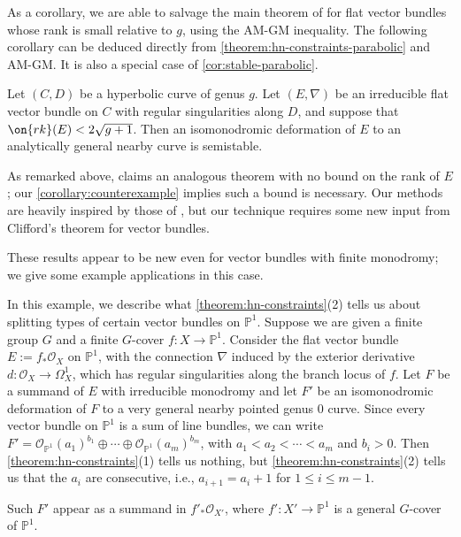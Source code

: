 As a corollary, we are able to salvage the main theorem of \cite{BHH:logarithmic} for flat vector bundles whose rank is small relative to $g$, using the AM-GM inequality.
The following corollary can be deduced directly from
\autoref{theorem:hn-constraints-parabolic} and AM-GM.
It is also a special
case of \autoref{cor:stable-parabolic}.
\begin{corollary}
\notready\label{cor:stable}
	Let $(C, D)$ be a hyperbolic curve of genus $g$.
Let $({E}, \nabla)$ be an irreducible flat
vector bundle on $C$ with regular singularities along $D$, and suppose that
$\on{rk}(E)<2\sqrt{g+1}$.
Then an isomonodromic deformation of
$E$
to an analytically general nearby curve is  semistable.
\end{corollary}
 As remarked above, \cite{BHH:logarithmic} claims an analogous theorem with no bound on the rank of $E$; our \autoref{corollary:counterexample} implies such a bound is necessary. Our methods are heavily inspired by those of \cite{BHH:logarithmic}, but our
technique requires some new input from Clifford's theorem for vector bundles.

These results appear to be new even for vector bundles with finite monodromy; we give some example applications in this case.
\begin{example}
\notready
	\label{example:splitting-type}
	In this example, we describe what
	\autoref{theorem:hn-constraints}(2) tells us about splitting types
	of certain vector bundles on $\mathbb P^1$.
	Suppose we are given a finite group $G$ and
	a finite $G$-cover $f: X \to \mathbb P^1$.
	Consider the flat vector bundle $E := f_* \mathscr O_X$ on $\mathbb P^1$, with the connection $\nabla$ induced by the exterior derivative $d: \mathscr{O}_X\to \Omega^1_X$,
	which has regular singularities along the branch locus of $f$.
	Let $F$ be a summand of $E$ with irreducible monodromy
	and let $F'$ be an isomonodromic deformation of $F$ to a very general
	nearby pointed genus $0$ curve.
	Since every vector bundle on $\mathbb P^1$ is a sum of line bundles,
	we can write $F' = \mathscr O_{\mathbb P^1}(a_1)^{b_1} \oplus \cdots
	\oplus \mathscr O_{\mathbb P^1}(a_m)^{b_m}$,
	with $a_1 < a_2 < \cdots < a_m$ and $b_i > 0$.
	Then \autoref{theorem:hn-constraints}(1) tells us nothing, but
	\autoref{theorem:hn-constraints}(2) tells us that the $a_i$ are
	consecutive, i.e., $a_{i + 1} = a_i + 1$ for $1 \leq i \leq m-1$.

	Such $F'$ appear as a summand in $f'_* \mathscr O_{X'}$, where $f': X'
	\to \mathbb P^1$ is a general $G$-cover of $\mathbb P^1$.
\end{example}

